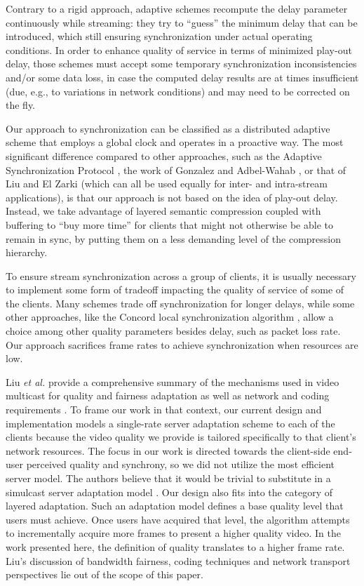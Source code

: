 \documentclass{sig-alternate}
\begin{document}
Contrary to a rigid approach, adaptive schemes
\cite{ASP,Lancaster,FSP} recompute the delay parameter continuously
while streaming: they try to ``guess'' the minimum delay that can be
introduced, which still ensuring synchronization under actual
operating conditions.  In order to enhance quality of service in terms
of minimized play-out delay, those schemes must accept some temporary
synchronization inconsistencies and/or some data loss, in case the
computed delay results are at times insufficient (due, e.g., to
variations in network conditions) and may need to be corrected on the
fly.

Our approach to synchronization can be classified as a distributed
adaptive scheme that employs a global clock and operates in a
proactive way.  The most significant difference compared to other
approaches, such as the Adaptive Synchronization Protocol \cite{ASP},
the work of Gonzalez and Adbel-Wahab \cite{GONZALEZ}, or that of Liu
and El Zarki\cite{LIUSYNC} (which can all be used equally for inter- and
intra-stream applications), is that our approach is not based on the
idea of play-out delay.  Instead, we take advantage of layered
semantic compression coupled with buffering to ``buy more time'' for
clients that might not otherwise be able to remain in sync, by putting
them on a less demanding level of the compression hierarchy.

To ensure stream synchronization across a group of clients, it is
usually necessary to implement some form of tradeoff impacting the
quality of service of some of the clients.  Many schemes trade off
synchronization for longer delays, while some other approaches, like
the Concord local synchronization algorithm
\cite{shivakumar95concord}, allow a choice among other quality
parameters besides delay, such as packet loss rate.  Our approach
sacrifices frame rates to achieve synchronization when resources are
low.

Liu {\it et al.} provide a comprehensive summary of the mechanisms
used in video multicast for quality and fairness adaptation as well as
network and coding requirements \cite{LIU2003}.  To frame our work in
that context, our current design and implementation models a
single-rate server adaptation scheme to each of the clients because
the video quality we provide is tailored specifically to that client's
network resources.  The focus in our work is directed towards the
client-side end-user perceived quality and synchrony, so we did not
utilize the most efficient server model.  The authors believe that it
would be trivial to substitute in a simulcast server adaptation model
\cite{cheung96use,li99video}.  Our design also fits into the category
of layered adaptation.  Such an adaptation model defines a base
quality level that users must achieve.  Once users have acquired that
level, the algorithm attempts to incrementally acquire more frames to
present a higher quality video.  In the work presented here, the
definition of quality translates to a higher frame rate.  Liu's
discussion of bandwidth fairness, coding techniques and network
transport perspectives lie out of the scope of this paper.
\end{document}
